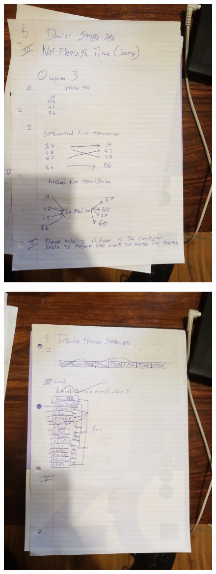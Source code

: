 \documentclass{article}
\begin{document}
	\begin{figure}
		\centering
		\includegraphics[width=\textwidth]{IMG_20210113_113211}
	\end{figure}
	\newpage
	\begin{figure}
		\centering
		\includegraphics[width=\textwidth]{IMG_20210113_113218}
	\end{figure}
\end{document}
